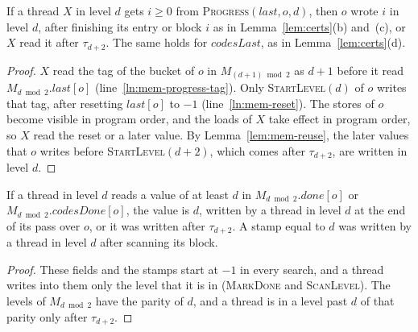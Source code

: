 \begin{lemma}[Progress]
\label{lem:mem-progress}
If a thread $X$ in level $d$ gets $i \geq 0$ from \textsc{Progress}$(\mathit{last}, o, d)$, then $o$ wrote $i$ in level $d$, after finishing its entry or block $i$ as in Lemma~\ref{lem:certs}(b) and~(c), or $X$ read it after $\tau_{d+2}$. The same holds for $\mathit{codesLast}$, as in Lemma~\ref{lem:certs}(d).
\end{lemma}
\begin{proof}
$X$ read the tag of the bucket of $o$ in $M_{(d+1) \bmod 2}$ as $d+1$ before it read $M_{d \bmod 2}.\mathit{last}[o]$ (line~\ref{ln:mem-progress-tag}). Only \textsc{StartLevel}$(d)$ of $o$ writes that tag, after resetting $\mathit{last}[o]$ to $-1$ (line~\ref{ln:mem-reset}). The stores of $o$ become visible in program order, and the loads of $X$ take effect in program order, so $X$ read the reset or a later value. By Lemma~\ref{lem:mem-reuse}, the later values that $o$ writes before \textsc{StartLevel}$(d+2)$, which comes after $\tau_{d+2}$, are written in level $d$.
\end{proof}

\begin{lemma}
\label{lem:mem-flags}
If a thread in level $d$ reads a value of at least $d$ in $M_{d \bmod 2}.\mathit{done}[o]$ or $M_{d \bmod 2}.\mathit{codesDone}[o]$, the value is $d$, written by a thread in level $d$ at the end of its pass over $o$, or it was written after $\tau_{d+2}$. A stamp equal to $d$ was written by a thread in level $d$ after scanning its block.
\end{lemma}
\begin{proof}
These fields and the stamps start at $-1$ in every search, and a thread writes into them only the level that it is in (\textsc{MarkDone} and \textsc{ScanLevel}). The levels of $M_{d \bmod 2}$ have the parity of $d$, and a thread is in a level past $d$ of that parity only after $\tau_{d+2}$.
\end{proof}

